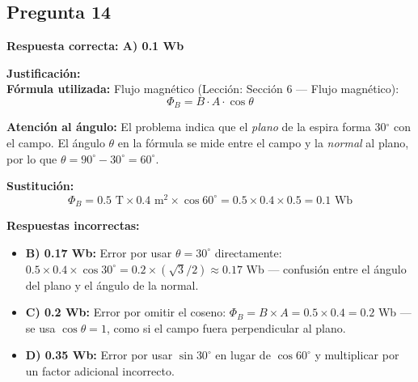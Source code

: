 \begin{respuestabox}
\subsection{Pregunta 14}
\textcolor{verdecorrecto}{\textbf{Respuesta correcta: A) 0.1 Wb}}

\textbf{Justificación:}\\
\textbf{Fórmula utilizada:} Flujo magnético (Lección: Sección 6 — Flujo magnético):
$$\Phi_B = B \cdot A \cdot \cos\theta$$

\textbf{Atención al ángulo:} El problema indica que el \textit{plano} de la espira forma 30$^\circ$ con el campo. El ángulo $\theta$ en la fórmula se mide entre el campo y la \textit{normal} al plano, por lo que $\theta = 90^\circ - 30^\circ = 60^\circ$.

\textbf{Sustitución:}
$$\Phi_B = 0.5 \text{ T} \times 0.4 \text{ m}^2 \times \cos 60^\circ = 0.5 \times 0.4 \times 0.5 = 0.1 \text{ Wb}$$

\textbf{Respuestas incorrectas:}
\begin{itemize}
    \item \textbf{B) 0.17 Wb:} Error por usar $\theta = 30^\circ$ directamente: $0.5 \times 0.4 \times \cos 30^\circ = 0.2 \times (\sqrt{3}/2) \approx 0.17$ Wb — confusión entre el ángulo del plano y el ángulo de la normal.
    \item \textbf{C) 0.2 Wb:} Error por omitir el coseno: $\Phi_B = B \times A = 0.5 \times 0.4 = 0.2$ Wb — se usa $\cos\theta = 1$, como si el campo fuera perpendicular al plano.
    \item \textbf{D) 0.35 Wb:} Error por usar $\sin 30^\circ$ en lugar de $\cos 60^\circ$ y multiplicar por un factor adicional incorrecto.
\end{itemize}
\end{respuestabox}

